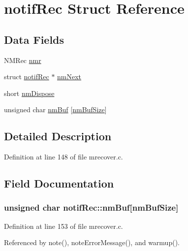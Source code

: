 \hypertarget{structnotifRec}{\section{notif\+Rec Struct Reference}
\label{structnotifRec}
}
\subsection*{Data Fields}
\begin{DoxyCompactItemize}
\item 
N\+M\+Rec \hyperlink{structnotifRec_aa1b6afb9d9cc1501336c1e65c5c7f1d4}{nmr}
\item 
struct \hyperlink{structnotifRec}{notif\+Rec} $\ast$ \hyperlink{structnotifRec_ab1cfb88fe48e04f9af34302fed55d087}{nm\+Next}
\item 
short \hyperlink{structnotifRec_a002162baa8a9b5cc6e32f457e410d330}{nm\+Dispose}
\item 
unsigned char \hyperlink{structnotifRec_a5e706085e796f65fdbe70ffdabe8c13c}{nm\+Buf} \mbox{[}\hyperlink{mrecover_8c_a79395dd1c4a47fa07561b062c8316e93}{nm\+Buf\+Size}\mbox{]}
\end{DoxyCompactItemize}


\subsection{Detailed Description}


Definition at line 148 of file mrecover.\+c.



\subsection{Field Documentation}
\hypertarget{structnotifRec_a5e706085e796f65fdbe70ffdabe8c13c}{
\subsubsection[{nm\+Buf}]{\setlength{\rightskip}{0pt plus 5cm}unsigned char notif\+Rec\+::nm\+Buf\mbox{[}{\bf nm\+Buf\+Size}\mbox{]}}}\label{structnotifRec_a5e706085e796f65fdbe70ffdabe8c13c}


Definition at line 153 of file mrecover.\+c.



Referenced by note(), note\+Error\+Message(), and warmup().


